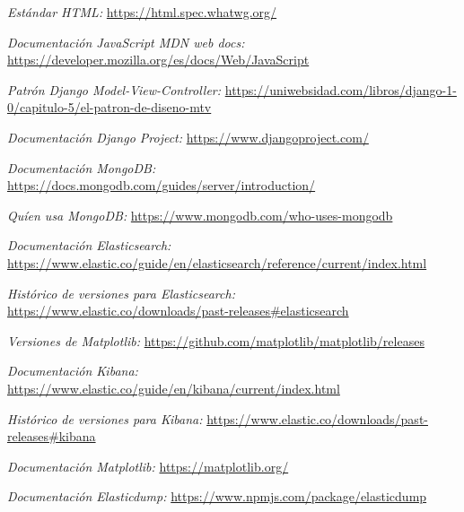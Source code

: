 \documentclass[a4paper, 12pt]{book}
\begin{document}
	\begin{thebibliography}{7}
		
		
		\textit{Estándar HTML:}
		\url{https://html.spec.whatwg.org/}
		
		\textit{Documentación JavaScript MDN web docs:}
		\url{https://developer.mozilla.org/es/docs/Web/JavaScript}	
		
		\textit{Patrón Django Model-View-Controller:}
		\url{https://uniwebsidad.com/libros/django-1-0/capitulo-5/el-patron-de-diseno-mtv}
		
		\textit{Documentación \textit{Django Project}:}
		\url{https://www.djangoproject.com/}
		
		\textit{Documentación MongoDB:}
		\url{https://docs.mongodb.com/guides/server/introduction/}	
		
		\textit{Quíen usa MongoDB:}
		\url{https://www.mongodb.com/who-uses-mongodb}
		
		\textit{Documentación Elasticsearch:}
		\url{https://www.elastic.co/guide/en/elasticsearch/reference/current/index.html}
		
		\textit{Histórico de versiones para Elasticsearch:}
		\url{https://www.elastic.co/downloads/past-releases#elasticsearch}	
		
		
		\textit{Versiones de Matplotlib:}
		\url{https://github.com/matplotlib/matplotlib/releases}	
		
		\textit{Documentación Kibana:}
		\url{https://www.elastic.co/guide/en/kibana/current/index.html}	
		
		\textit{Histórico de versiones para Kibana:}
		\url{https://www.elastic.co/downloads/past-releases#kibana}	
		
		\textit{Documentación Matplotlib:}
		\url{https://matplotlib.org/}
		
		\textit{Documentación Elasticdump:}
		\url{https://www.npmjs.com/package/elasticdump}	
		
		
		
		
		
		
		
		
	\end{thebibliography}
	
\end{document}
